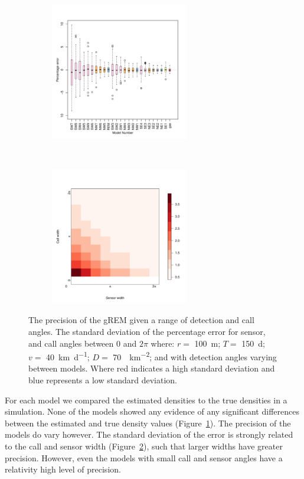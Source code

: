 \documentclass[a4paper,10pt,reqno,oneside]{amsart}
\begin{document}
\begin{figure}
	\centering
	\begin{subfigure}[t]{60mm}
		\includegraphics[width=60mm]{imgs/AverageModelBias.pdf}
		\label{f:ModelBias}
		\caption{} 
	\end{subfigure}
	~
	\begin{subfigure}[t]{60mm}
		\includegraphics[width=60mm]{imgs/ResultStandardDeviation.pdf}
		\label{f:StandardDevaition}
		\caption{} 
        \end{subfigure}
        \caption{The precision of the gREM given a range of detection and call angles. The standard deviation of the percentage error for sensor, and call angles between 0 and $2\pi$ where: $r = $ \SI{100}{\meter}; $T = $ \SI{150}{\day}; $v = $ \SI{40}{\kilo\meter\per\day}; $D = $ \SI{70}{\animals\per\kilo\meter\squared}; and with detection angles varying between models. Where red indicates a high standard deviation and blue represents a low standard deviation.} 
	\label{f:AccAndPrec}
\end{figure}

For each model we compared the estimated densities to the true densities in a simulation. None of the models showed any evidence of any significant differences between the estimated and true density values (Figure~\ref{f:ModelBias}). The precision of the models do vary however. The standard deviation of the error is strongly related to the call and sensor width (Figure~\ref{f:StandardDevaition}), such that larger widths have greater precision. However, even the models with small call and sensor angles have a relativity high level of precision. 
\end{document}
